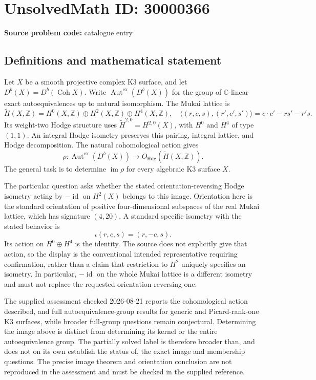 \documentclass[11pt]{article}
\newcommand{\Z}{\mathbb{Z}}
\newcommand{\C}{\mathbb{C}}
\begin{document}
\section*{UnsolvedMath ID: 30000366}
\textbf{Source problem code:} catalogue entry
\subsection{Definitions and mathematical statement}
Let \(X\) be a smooth projective complex K3 surface, and let \(D^b(X)=D^b(\operatorname{Coh}X)\). Write \(\operatorname{Aut}^{\mathrm{ex}}(D^b(X))\) for the group of \(\C\)-linear exact autoequivalences up to natural isomorphism. The Mukai lattice is
\[
\widetilde H(X,\Z)=H^0(X,\Z)\oplus H^2(X,\Z)\oplus H^4(X,\Z),
\quad
\langle(r,c,s),(r',c',s')\rangle=c\cdot c'-rs'-r's.
\]
Its weight-two Hodge structure uses \(\widetilde H^{2,0}=H^{2,0}(X)\), with \(H^0\) and \(H^4\) of type \((1,1)\). An integral Hodge isometry preserves this pairing, integral lattice, and Hodge decomposition. The natural cohomological action gives
\[
\rho:\operatorname{Aut}^{\mathrm{ex}}(D^b(X))\longrightarrow
O_{\mathrm{Hdg}}(\widetilde H(X,\Z)).
\]
The general task is to determine \(\operatorname{im}\rho\) for every algebraic K3 surface \(X\).

The particular question asks whether the stated orientation-reversing Hodge isometry acting by \(-\operatorname{id}\) on \(H^2(X)\) belongs to this image. Orientation here is the standard orientation of positive four-dimensional subspaces of the real Mukai lattice, which has signature \((4,20)\). A standard specific isometry with the stated behavior is
\[
\iota(r,c,s)=(r,-c,s).
\]
Its action on \(H^0\oplus H^4\) is the identity. The source does not explicitly give that action, so the display is the conventional intended representative requiring confirmation, rather than a claim that restriction to \(H^2\) uniquely specifies an isometry. In particular, \(-\operatorname{id}\) on the whole Mukai lattice is a different isometry and must not replace the requested orientation-reversing one.

The supplied assessment checked 2026-08-21 reports the cohomological action described, and full autoequivalence-group results for generic and Picard-rank-one K3 surfaces, while broader full-group questions remain conjectural. Determining the image above is distinct from determining its kernel or the entire autoequivalence group. The partially solved label is therefore broader than, and does not on its own establish the status of, the exact image and membership questions. The precise image theorem and orientation conclusion are not reproduced in the assessment and must be checked in the supplied reference.
\end{document}
